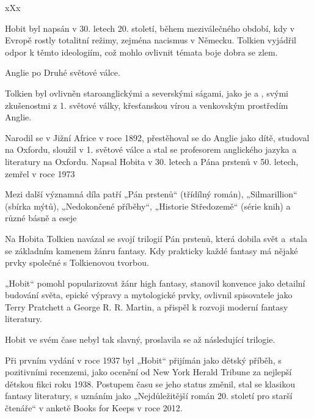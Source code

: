 \documentclass{extarticle} %
\begin{document}
\noindent 
xXx


\noindent Hobit byl napsán v 30. letech 20. století,
během meziválečného období, kdy v Evropě rostly totalitní režimy, zejména nacismus v Německu.
Tolkien vyjádřil odpor k těmto ideologiím, což mohlo ovlivnit témata boje dobra se zlem.

\noindent Anglie po Druhé světové válce.


\noindent Tolkien byl ovlivněn staroanglickými a severskými ságami,
jako je  a ,
svými zkušenostmi z 1. světové války,
křesťanskou vírou a venkovským prostředím Anglie.

\noindent Narodil se v Jižní Africe v roce 1892,
přestěhoval se do Anglie jako dítě, studoval na Oxfordu,
sloužil v 1. světové válce a stal se profesorem anglického jazyka a literatury na Oxfordu.
Napsal Hobita v 30. letech a Pána prstenů v 50. letech, zemřel v roce 1973


\noindent 
Mezi další významná díla patří „Pán prstenů“ (třídílný román), „Silmarillion“ (sbírka mýtů),
„Nedokončené příběhy“, „Historie Středozemě“ (série knih) a různé básně a eseje

\noindent Na Hobita Tolkien navázal se svojí trilogií Pán prstenů, která dobila svět
a~stala se základním kamenem žánru fantasy.
Kdy prakticky každé fantasy má nějaké prvky společné s Tolkienovou tvorbou.

„Hobit“ pomohl popularizovat žánr high fantasy,
stanovil konvence jako detailní budování světa, epické výpravy a mytologické prvky,
ovlivnil spisovatele jako Terry Pratchett a George R. R. Martin,
a přispěl k rozvoji moderní fantasy literatury.


\noindent Hobit ve svém čase nebyl tak slavný, proslavila se až následující trilogie.

Při prvním vydání v roce 1937 byl „Hobit“ přijímán jako dětský příběh,
s pozitivními recenzemi,
jako ocenění od New York Herald Tribune za nejlepší dětskou fikci roku 1938.
Postupem času se jeho status změnil, stal se klasikou fantasy literatury,
s uznáním jako „Nejdůležitější román 20. století pro starší čtenáře“
v anketě Books for Keeps v roce 2012.
\end{document}
